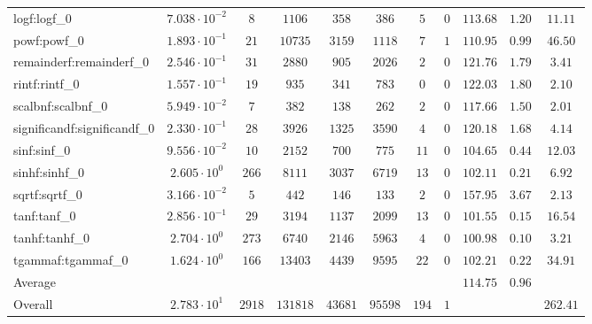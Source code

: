 \begin{tabular}{|l|c|c|c|c|c|c|c|c|c|c|}
logf:logf\_0                 & $ 7.038 \cdot 10^{-2} $ & $ 8      $ & $ 1106   $ & $ 358   $ & $ 386   $ & $ 5   $ & $ 0 $ & $ 113.68      $ & $ 1.20    $ & $ 11.11   $ \\
powf:powf\_0                 & $ 1.893 \cdot 10^{-1} $ & $ 21     $ & $ 10735  $ & $ 3159  $ & $ 1118  $ & $ 7   $ & $ 1 $ & $ 110.95      $ & $ 0.99    $ & $ 46.50   $ \\
remainderf:remainderf\_0     & $ 2.546 \cdot 10^{-1} $ & $ 31     $ & $ 2880   $ & $ 905   $ & $ 2026  $ & $ 2   $ & $ 0 $ & $ 121.76      $ & $ 1.79    $ & $ 3.41    $ \\
rintf:rintf\_0               & $ 1.557 \cdot 10^{-1} $ & $ 19     $ & $ 935    $ & $ 341   $ & $ 783   $ & $ 0   $ & $ 0 $ & $ 122.03      $ & $ 1.80    $ & $ 2.10    $ \\
scalbnf:scalbnf\_0           & $ 5.949 \cdot 10^{-2} $ & $ 7      $ & $ 382    $ & $ 138   $ & $ 262   $ & $ 2   $ & $ 0 $ & $ 117.66      $ & $ 1.50    $ & $ 2.01    $ \\
significandf:significandf\_0 & $ 2.330 \cdot 10^{-1} $ & $ 28     $ & $ 3926   $ & $ 1325  $ & $ 3590  $ & $ 4   $ & $ 0 $ & $ 120.18      $ & $ 1.68    $ & $ 4.14    $ \\
sinf:sinf\_0                 & $ 9.556 \cdot 10^{-2} $ & $ 10     $ & $ 2152   $ & $ 700   $ & $ 775   $ & $ 11  $ & $ 0 $ & $ 104.65      $ & $ 0.44    $ & $ 12.03   $ \\
sinhf:sinhf\_0               & $ 2.605 \cdot 10^{0}  $ & $ 266    $ & $ 8111   $ & $ 3037  $ & $ 6719  $ & $ 13  $ & $ 0 $ & $ 102.11      $ & $ 0.21    $ & $ 6.92    $ \\
sqrtf:sqrtf\_0               & $ 3.166 \cdot 10^{-2} $ & $ 5      $ & $ 442    $ & $ 146   $ & $ 133   $ & $ 2   $ & $ 0 $ & $ 157.95      $ & $ 3.67    $ & $ 2.13    $ \\
tanf:tanf\_0                 & $ 2.856 \cdot 10^{-1} $ & $ 29     $ & $ 3194   $ & $ 1137  $ & $ 2099  $ & $ 13  $ & $ 0 $ & $ 101.55      $ & $ 0.15    $ & $ 16.54   $ \\
tanhf:tanhf\_0               & $ 2.704 \cdot 10^{0}  $ & $ 273    $ & $ 6740   $ & $ 2146  $ & $ 5963  $ & $ 4   $ & $ 0 $ & $ 100.98      $ & $ 0.10    $ & $ 3.21    $ \\
tgammaf:tgammaf\_0           & $ 1.624 \cdot 10^{0}  $ & $ 166    $ & $ 13403  $ & $ 4439  $ & $ 9595  $ & $ 22  $ & $ 0 $ & $ 102.21      $ & $ 0.22    $ & $ 34.91   $ \\
\hline
Average                      & $                     $ & $        $ & $        $ & $       $ & $       $ & $     $ & $   $ & $ 114.75      $ & $ 0.96    $ & $         $ \\
\hline
Overall                      & $ 2.783 \cdot 10^{1}  $ & $ 2918   $ & $ 131818 $ & $ 43681 $ & $ 95598 $ & $ 194 $ & $ 1 $ & $             $ & $         $ & $ 262.41  $ \\
\hline
\end{tabular}
